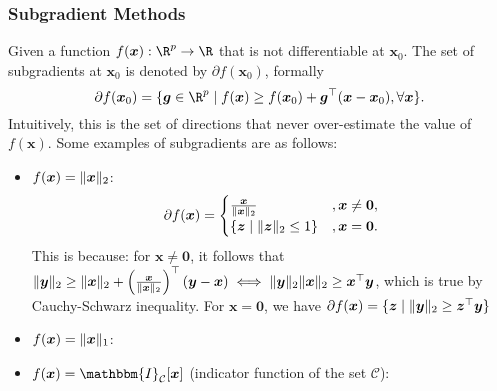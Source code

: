     \subsubsection{Subgradient Methods}
    Given a function $f(\bm{x}): \R^\nfeat \rightarrow \R$ that is not differentiable at $\bm{x}_0$. 
    The set of subgradients at $\bm{x}_0$ is denoted by $\partial f(\bm{x}_0)$, formally
        \begin{equation}
            \partial f(\bm{x}_0) = \Set{\bm{g} \in \R^\nfeat}{f(\bm{x}) \ge f(\bm{x}_0) + \bm{g}^\top (\bm{x} - \bm{x}_0), \forall \bm{x}}.
        \end{equation}
    Intuitively, this is the set of directions that never over-estimate the value of $f(\bm{x})$.
    Some examples of subgradients are as follows:
        \begin{itemize}
            \item $f(\bm{x}) = \lVert\bm{x}\rVert_2$:
                \begin{equation}
                    \partial f(\bm{x}) = \begin{cases}
                        \frac{\bm{x}}{\lVert\bm{x}\rVert_2} & , \bm{x} \ne \bm{0},\\
                        \{ \bm{z} \mid \lVert\bm{z}\rVert_2 \le 1 \} &, \bm{x} = \bm{0}.
                    \end{cases}
                \end{equation}
            This is because: for $\bm{x} \ne \bm{0}$, it follows that $\lVert\bm{y}\rVert_2 \ge \lVert\bm{x}\rVert_2 + \left(\frac{\bm{x}}{\lVert\bm{x}\rVert_2}\right)^\top (\bm{y} - \bm{x}) \iff \lVert\bm{y}\rVert_2 \lVert\bm{x}\rVert_2 \ge \bm{x}^\top \bm{y}$, which is true by Cauchy-Schwarz inequality.
            For $\bm{x} = \bm{0}$, we have $\partial f(\bm{x}) = \{ \bm{z} \mid \lVert\bm{y}\rVert_2 \ge \bm{z}^\top \bm{y} \}$
            \item $f(\bm{x}) = \lVert\bm{x}\rVert_1$:
            \item $f(\bm{x}) = \mathbbm{I}_\mathcal{C}[\bm{x}]$ (indicator function of the set $\mathcal{C}$):
        \end{itemize}
    
